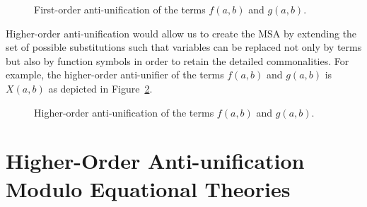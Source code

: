 \begin{figure}[t]
\centering{}
\caption{First-order anti-unification of the terms $f(a,b)$ and $g(a,b)$.\label{fig:first-anti-uni}}
\end{figure}

Higher-order anti-unification would allow us to create the MSA by extending the set of possible substitutions such that variables can be replaced not only by terms but also by function symbols in order to retain the detailed commonalities. For example, the higher-order anti-unifier of the terms $f(a,b)$ and $g(a,b)$ is $X(a,b)$ as depicted in Figure~\ref{fig:higher-anti-uni}.
\begin{figure}[t]
\centering{}
\caption{Higher-order anti-unification of the terms $f(a,b)$ and $g(a,b)$.\label{fig:higher-anti-uni}}
\end{figure}

\section{Higher-Order Anti-unification Modulo Equational Theories}\label{HOAUMT}

